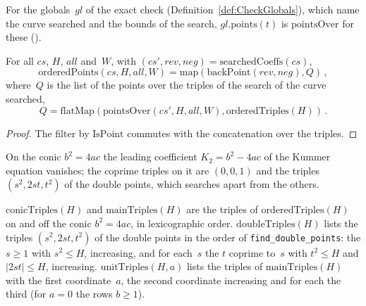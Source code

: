 For the globals~$\mathit{gl}$ of the exact check (Definition~\ref{def:CheckGlobals}), which name
the curve searched and the bounds of the search, $\mathit{gl}.\mathrm{points}(t)$ is
$\mathrm{pointsOver}$ for these ().

\begin{lemma}\label{lem:orderedPoints_eq_map_flatMap_pointsOver}
  \leanok
  For all $\mathit{cs}$, $H$, $\mathit{all}$ and~$W$, with $(\mathit{cs}', \mathit{rev},
  \mathit{neg}) = \mathrm{searchedCoeffs}(\mathit{cs})$,
  \[ \mathrm{orderedPoints}(\mathit{cs}, H, \mathit{all}, W) =
     \mathrm{map}(\mathrm{backPoint}(\mathit{rev}, \mathit{neg}), Q)\,, \]
  where~$Q$ is the list of the points over the triples of the search of the curve searched,
  \[ Q = \mathrm{flatMap}(\mathrm{pointsOver}(\mathit{cs}', H, \mathit{all}, W),
     \mathrm{orderedTriples}(H))\,. \]
\end{lemma}

\begin{proof}
  \leanok
  The filter by $\mathrm{IsPoint}$ commutes with the concatenation over the triples.
\end{proof}

On the conic $b^2 = 4ac$ the leading coefficient $K_2 = b^2 - 4ac$ of the Kummer equation vanishes;
the coprime triples on it are $(0, 0, 1)$ and the triples $(s^2, 2st, t^2)$ of the double points,
which \jpoints{} searches apart from the others.

\begin{definition}\label{def:mainTriples}
  \leanok
  $\mathrm{conicTriples}(H)$ and $\mathrm{mainTriples}(H)$ are the triples of
  $\mathrm{orderedTriples}(H)$ on and off the conic $b^2 = 4ac$, in lexicographic order.
  $\mathrm{doubleTriples}(H)$ lists the triples $(s^2, 2st, t^2)$ of the double points in the order
  of \texttt{find\_double\_points}: the $s \ge 1$ with $s^2 \le H$, increasing, and for each~$s$ the
  $t$ coprime to~$s$ with $t^2 \le H$ and $|2st| \le H$, increasing. $\mathrm{unitTriples}(H, a)$
  lists the triples of $\mathrm{mainTriples}(H)$ with the first coordinate~$a$, the second
  coordinate increasing and for each the third (for $a = 0$ the rows $b \ge 1$).
\end{definition}

